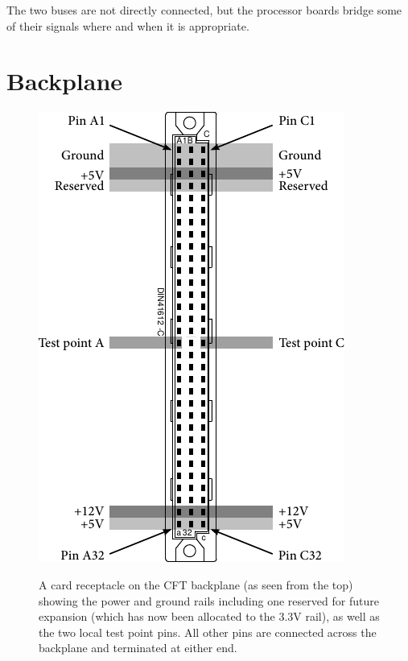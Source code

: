 The two buses are not directly connected, but the processor boards bridge some
of their signals where and when it is appropriate.

\section{Backplane}
\label{sec:backplane}

\begin{figure}
\centering
\includegraphics{figs/din41612.pdf}\\
\caption[A DIN41612 receptacle with power rails]{\label{fig:slot}A card
  receptacle on the CFT backplane (as seen from the top) showing the power and
  ground rails including one reserved for future expansion (which has now been
  allocated to the 3.3V rail), as well as the two local test point pins. All
  other pins are connected across the backplane and terminated at either end.
}
\end{figure}

